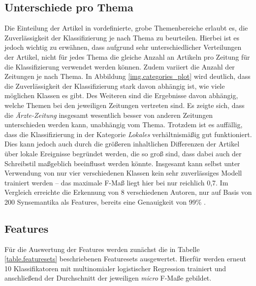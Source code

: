 \subsection{Unterschiede pro Thema}
Die Einteilung der Artikel in vordefinierte, grobe Themenbereiche erlaubt es, die Zuverlässigkeit der Klassifizierung je nach Thema zu beurteilen. Hierbei ist es jedoch wichtig zu erwähnen, dass aufgrund sehr unterschiedlicher Verteilungen der Artikel, nicht für jedes Thema die gleiche Anzahl an Artikeln pro Zeitung für die Klassifizierung verwendet werden können. Zudem variiert die Anzahl der Zeitungen je nach Thema. In Abbildung \ref{img.categories_plot} wird deutlich, dass die Zuverlässigkeit der Klassifizierung stark davon abhängig ist, wie viele möglichen Klassen es gibt. Des Weiteren sind die Ergebnisse davon abhängig, welche Themen bei den jeweiligen Zeitungen vertreten sind. Es zeigte sich, dass die \emph{Ärzte-Zeitung} insgesamt wesentlich besser von anderen Zeitungen unterschieden werden kann, unabhängig vom Thema. Trotzdem ist es auffällig, dass die Klassifizierung in der Kategorie \emph{Lokales} verhältnismäßig gut funktioniert. Dies kann jedoch auch durch die größeren inhaltlichen Differenzen der Artikel über lokale Ereignisse begründet werden, die so groß sind, dass dabei auch der Schreibstil maßgeblich beeinflusst werden könnte. Insgesamt kann selbst unter Verwendung von nur vier verschiedenen Klassen kein sehr zuverlässiges Modell trainiert werden -- das maximale F-Maß liegt hier bei nur reichlich 0,7. Im Vergleich erreichte die Erkennung von 8 verschiedenen Autoren, nur auf Basis von 200 Synsemantika als Features, bereits eine Genauigkeit von 99\% \cite[S.~2]{argamon2005measuring}.


\subsection{Features}\label{features_analyzed}
Für die Auswertung der Features werden zunächst die in Tabelle \ref{table.featuresets} beschriebenen Featuresets ausgewertet. Hierfür werden erneut 10 Klassifikatoren mit multinomialer logistischer Regression trainiert und anschließend der Durchschnitt der jeweiligen \textit{micro} F-Maße gebildet.



